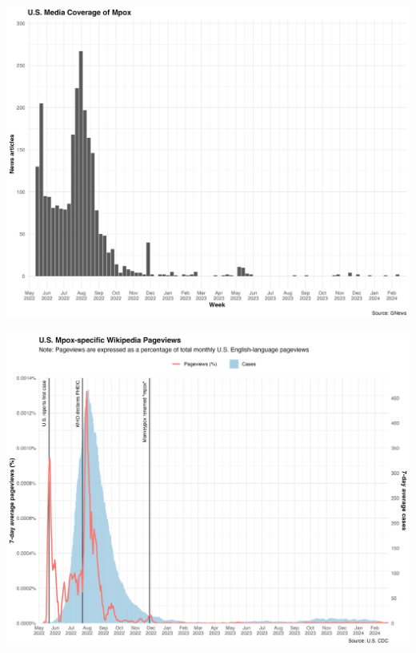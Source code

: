 \documentclass[
  12pt,
]{article}
\begin{document}
\begin{center}
\includegraphics{images/mpox-news-USA-weekly.png}
\end{center}

\begin{center}
\includegraphics{images/mpox-cases-&-wiki-pageviews-USA-rolling-avg.png}
\end{center}
\end{document}
